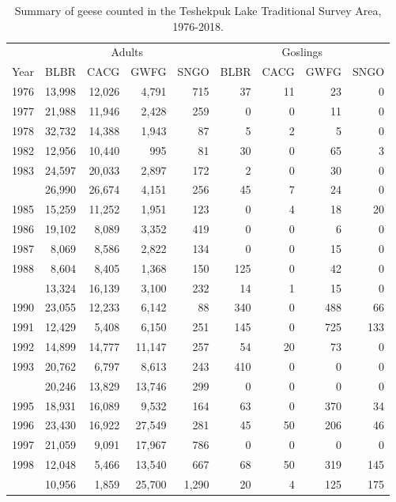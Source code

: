 \documentclass[]{article}
\begin{document}
\begin{table}

\caption{\label{tab:Kable_76_18}Summary of geese counted in the Teshekpuk Lake Traditional Survey Area, 1976-2018.}
\centering
\begin{tabular}[t]{lrrrrrrrr}
\toprule
\multicolumn{1}{c}{} & \multicolumn{4}{c}{Adults} & \multicolumn{4}{c}{Goslings} \\
\cmidrule(l{2pt}r{2pt}){2-5} \cmidrule(l{2pt}r{2pt}){6-9}
Year & BLBR & CACG & GWFG & SNGO & BLBR & CACG & GWFG & SNGO\\
\midrule
1976 & 13,998 & 12,026 & 4,791 & 715 & 37 & 11 & 23 & 0\\
1977 & 21,988 & 11,946 & 2,428 & 259 & 0 & 0 & 11 & 0\\
1978 & 32,732 & 14,388 & 1,943 & 87 & 5 & 2 & 5 & 0\\
1982 & 12,956 & 10,440 & 995 & 81 & 30 & 0 & 65 & 3\\
1983 & 24,597 & 20,033 & 2,897 & 172 & 2 & 0 & 30 & 0\\
\addlinespace
1984 & 26,990 & 26,674 & 4,151 & 256 & 45 & 7 & 24 & 0\\
1985 & 15,259 & 11,252 & 1,951 & 123 & 0 & 4 & 18 & 20\\
1986 & 19,102 & 8,089 & 3,352 & 419 & 0 & 0 & 6 & 0\\
1987 & 8,069 & 8,586 & 2,822 & 134 & 0 & 0 & 15 & 0\\
1988 & 8,604 & 8,405 & 1,368 & 150 & 125 & 0 & 42 & 0\\
\addlinespace
1989 & 13,324 & 16,139 & 3,100 & 232 & 14 & 1 & 15 & 0\\
1990 & 23,055 & 12,233 & 6,142 & 88 & 340 & 0 & 488 & 66\\
1991 & 12,429 & 5,408 & 6,150 & 251 & 145 & 0 & 725 & 133\\
1992 & 14,899 & 14,777 & 11,147 & 257 & 54 & 20 & 73 & 0\\
1993 & 20,762 & 6,797 & 8,613 & 243 & 410 & 0 & 0 & 0\\
\addlinespace
1994 & 20,246 & 13,829 & 13,746 & 299 & 0 & 0 & 0 & 0\\
1995 & 18,931 & 16,089 & 9,532 & 164 & 63 & 0 & 370 & 34\\
1996 & 23,430 & 16,922 & 27,549 & 281 & 45 & 50 & 206 & 46\\
1997 & 21,059 & 9,091 & 17,967 & 786 & 0 & 0 & 0 & 0\\
1998 & 12,048 & 5,466 & 13,540 & 667 & 68 & 50 & 319 & 145\\
\addlinespace
1999 & 10,956 & 1,859 & 25,700 & 1,290 & 20 & 4 & 125 & 175\\

\end{tabular}
\end{table}
\end{document}
